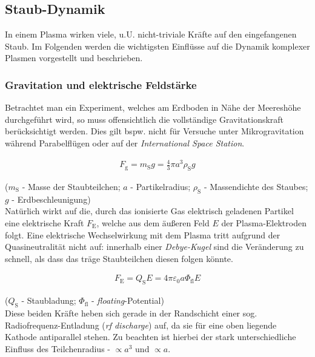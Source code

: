 \documentclass[numbers=noenddot,a4paper]{scrartcl}
\newcommand{\ix}[1]{_\text{#1}}
\newcommand{\tilt}[1]{\textit{#1}}
\begin{document}
		\subsection{Staub-Dynamik}\label{subsec:dynamik}
		
				In einem Plasma wirken viele, u.U. nicht-triviale Kräfte auf den eingefangenen Staub. Im Folgenden werden die wichtigsten Einflüsse auf die Dynamik komplexer Plasmen vorgestellt und beschrieben.\\
				\subsubsection{Gravitation und elektrische Feldstärke}\label{subsub:grav}
				
				Betrachtet man ein Experiment, welches am Erdboden in Nähe der Meereshöhe durchgeführt wird, so muss offensichtlich die vollständige Gravitationskraft berücksichtigt werden. Dies gilt bspw. nicht für Versuche unter Mikrogravitation während Parabelflügen oder auf der \tilt{International Space Station}.
				
					\begin{align}
						F\ix{g}=m\ix{S} g=\frac{4}{3}\pi a^3 \rho\ix{S} g
					\end{align}
				
				($m\ix{S}$ - Masse der Staubteilchen; $a$ - Partikelradius; $\rho\ix{S}$ - Massendichte des Staubes; $g$ - \mbox{Erdbeschleunigung})\\
				Natürlich wirkt auf die, durch das ionisierte Gas elektrisch geladenen Partikel eine elektrische Kraft $F\ix{E}$, welche aus dem äußeren Feld $E$ der Plasma-Elektroden folgt. Eine elektrische Wechselwirkung mit dem Plasma tritt aufgrund der Quasineutralität nicht auf: innerhalb einer \tilt{Debye-Kugel} sind die Veränderung zu schnell, als dass das träge Staubteilchen diesen folgen könnte. 
				
					\begin{align}
					F\ix{E}=Q\ix{S} E=4 \pi \varepsilon\ix{0} a \Phi\ix{fl} E
					\end{align}
		
				($Q\ix{S}$ - Staubladung; $\Phi\ix{fl}$ - \tilt{floating}-Potential)\\
				Diese beiden Kräfte heben sich gerade in der Randschicht einer sog. Radiofrequenz-Entladung (\tilt{rf discharge}) auf, da sie für eine oben liegende Kathode antiparallel stehen. Zu beachten ist hierbei der stark unterschiedliche Einfluss des Teilchenradius - $\propto a^3$ und $\propto a$.\\
								
\end{document}
